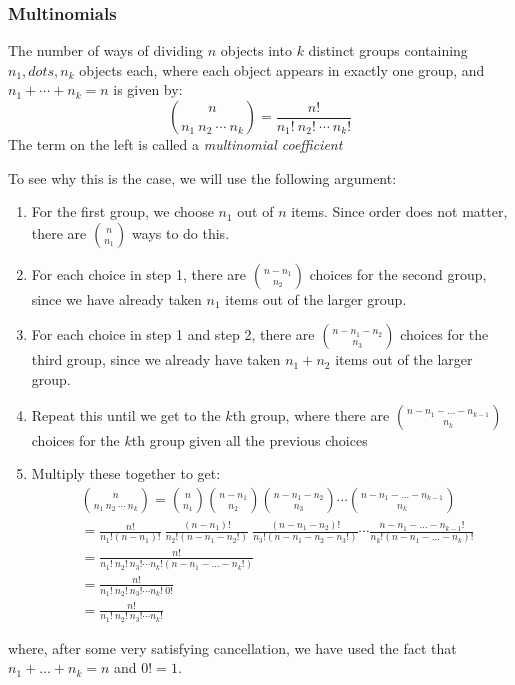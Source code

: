 \documentclass[12pt]{article}
\theoremstyle{definition}
\theoremstyle{remark}
\begin{document}
\subsubsection{Multinomials}
\begin{framed}
The number of ways of dividing $n$ objects into $k$ distinct groups containing $n_1, dots, n_k$ objects each, where each object appears in exactly one group, and $n_1 + \cdots + n_k = n$ is given by:
\[
\binom{n}{n_1 \: n_2\: \cdots \:n_k} = \frac{n!}{n_1!\:n_2!\:\cdots\:n_k!}
\]
The term on the left is called a \emph{multinomial coefficient}
\end{framed}
To see why this is the case, we will use the following argument:
\begin{enumerate}
\item For the first group, we choose $n_1$ out of $n$ items. Since order does not matter, there are $\binom{n}{n_1}$ ways to do this.
\item For each choice in step 1, there are $\binom{n - n_1}{n_2}$ choices for the second group, since we have already taken $n_1$ items out of the larger group.
\item For each choice in step 1 and step 2, there are $\binom{n - n_1 - n_2}{n_3}$ choices for the third group, since we already have taken $n_1 + n_2$ items out of the larger group.
\item Repeat this until we get to the $k$th group, where there are $\binom{n - n_1 - \dots - n_{k-1}}{n_k}$ choices for the $k$th group given all the previous choices
\item Multiply these together to get:
\begin{align*}
&\binom{n}{n_1 \: n_2\: \cdots \:n_k} = \binom{n}{n_1} \binom{n - n_1}{n_2} \binom{n - n_1 - n_2}{n_3} \cdots \binom{n - n_1 - \dots - n_{k-1}}{n_k} \\
&= \frac{n!}{n_1! (n - n_1)!}\:\frac{(n - n_1)!}{n_2!(n - n_1 - n_2!)}\:\frac{(n - n_1 - n_2)!}{n_3!(n - n_1 - n_2 - n_3!)}\cdots\frac{n - n_1 - \dots - n_{k-1}!}{n_k! (n - n_1 - \dots - n_k)!}\\
&= \frac{n!}{n_1! \: n_2! \: n_3! \cdots n_k! (n - n_1 - \dots - n_k! )} \\
&= \frac{n!}{n_1! \: n_2! \: n_3! \cdots n_k! \: 0! } \\
&= \frac{n!}{n_1! \: n_2! \: n_3! \cdots n_k! }
\end{align*}
\end{enumerate}
where, after some very satisfying cancellation, we have used the fact that $n_1 + \dots + n_k = n$ and $0! = 1$.\\
\end{document}
